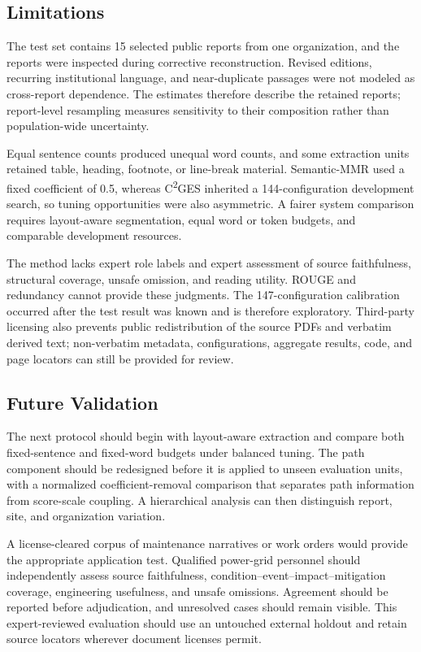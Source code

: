 \documentclass[applsci,article,submit,moreauthors]{Definitions/mdpi}
\newcommand{\cges}{C\textsuperscript{2}GES}
\begin{document}
\subsection{Limitations}

The test set contains 15 selected public reports from one organization, and the reports were inspected during corrective reconstruction. Revised editions, recurring institutional language, and near-duplicate passages were not modeled as cross-report dependence. The estimates therefore describe the retained reports; report-level resampling measures sensitivity to their composition rather than population-wide uncertainty.

Equal sentence counts produced unequal word counts, and some extraction units retained table, heading, footnote, or line-break material. Semantic-MMR used a fixed coefficient of 0.5, whereas \cges{} inherited a 144-configuration development search, so tuning opportunities were also asymmetric. A fairer system comparison requires layout-aware segmentation, equal word or token budgets, and comparable development resources.

The method lacks expert role labels and expert assessment of source faithfulness, structural coverage, unsafe omission, and reading utility. ROUGE and redundancy cannot provide these judgments. The 147-configuration calibration occurred after the test result was known and is therefore exploratory. Third-party licensing also prevents public redistribution of the source PDFs and verbatim derived text; non-verbatim metadata, configurations, aggregate results, code, and page locators can still be provided for review.

\subsection{Future Validation}

The next protocol should begin with layout-aware extraction and compare both fixed-sentence and fixed-word budgets under balanced tuning. The path component should be redesigned before it is applied to unseen evaluation units, with a normalized coefficient-removal comparison that separates path information from score-scale coupling. A hierarchical analysis can then distinguish report, site, and organization variation.

A license-cleared corpus of maintenance narratives or work orders would provide the appropriate application test. Qualified power-grid personnel should independently assess source faithfulness, condition--event--impact--mitigation coverage, engineering usefulness, and unsafe omissions. Agreement should be reported before adjudication, and unresolved cases should remain visible. This expert-reviewed evaluation should use an untouched external holdout and retain source locators wherever document licenses permit.
\end{document}
